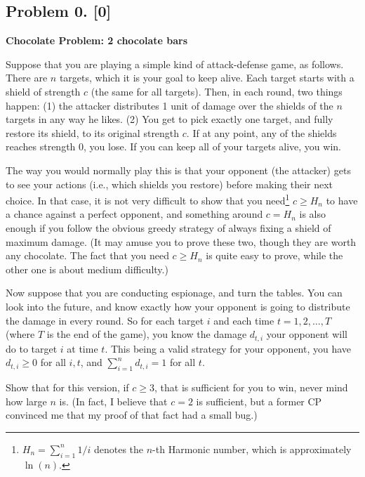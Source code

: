 \documentclass[10pt]{article}
\begin{document}
\subsection*{Problem 0. [0]}
  \textbf{Chocolate Problem: 2 chocolate bars}
  
  Suppose that you are playing a simple kind of attack-defense game, as follows. There are $n$ targets, which it is your goal to keep alive. Each target starts with a shield of strength $c$ (the same for all targets). Then, in each round, two things happen: (1) the attacker distributes 1 unit of damage over the shields of the $n$ targets in any way he likes. (2) You get to pick exactly one target, and fully restore its shield, to its original strength $c$. If at any point, any of the shields reaches strength 0, you lose. If you can keep all of your targets alive, you win.

  The way you would normally play this is that your opponent (the attacker) gets to see your actions (i.e., which shields you restore) before making their next choice. In that case, it is not very difficult to show that you need\footnote{$H_n = \sum_{i=1}^n 1/i$ denotes the $n$-th Harmonic number, which is approximately $\ln(n)$.} $c \geq H_n$ to have a chance against a perfect opponent, and something around $c = H_n$ is also enough if you follow the obvious greedy strategy of always fixing a shield of maximum damage. (It may amuse you to prove these two, though they are worth any chocolate. The fact that you need $c \geq H_n$ is quite easy to prove, while the other one is about medium difficulty.)

  Now suppose that you are conducting espionage, and turn the tables. You can look into the future, and know exactly how your opponent is going to distribute the damage in every round. So for each target $i$ and each time $t=1, 2, \ldots, T$ (where $T$ is the end of the game), you know the damage $d_{t,i}$ your opponent will do to target $i$ at time $t$. This being a valid strategy for your opponent, you have $d_{t,i} \geq 0$ for all $i,t$, and $\sum_{i=1}^n d_{t,i} = 1$ for all $t$.

  Show that for this version, if $c \geq 3$, that is sufficient for you to win, never mind how large $n$ is. (In fact, I believe that $c=2$ is sufficient, but a former CP convinced me that my proof of that fact had a small bug.)
\end{document}
